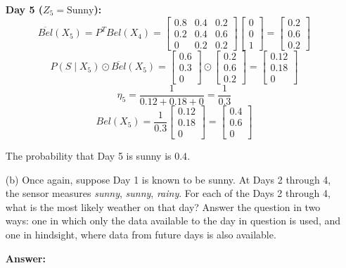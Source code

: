 \documentclass{article}
\begin{document}
\begin{enumerate}
    \textbf{Day 5 ($Z_5 = \text{Sunny}$):}
    $$ \overline{Bel}(X_5) = P^T Bel(X_4) = \begin{bmatrix} 0.8 & 0.4 & 0.2 \\ 0.2 & 0.4 & 0.6 \\ 0 & 0.2 & 0.2 \end{bmatrix} \begin{bmatrix} 0 \\ 0 \\ 1 \end{bmatrix} = \begin{bmatrix} 0.2 \\ 0.6 \\ 0.2 \end{bmatrix} $$
    $$ P(S \mid X_5) \odot \overline{Bel}(X_5) = \begin{bmatrix} 0.6 \\ 0.3 \\ 0 \end{bmatrix} \odot \begin{bmatrix} 0.2 \\ 0.6 \\ 0.2 \end{bmatrix} = \begin{bmatrix} 0.12 \\ 0.18 \\ 0 \end{bmatrix} $$
    $$ \eta_5 = \frac{1}{0.12 + 0.18 + 0} = \frac{1}{0.3} $$
    $$ Bel(X_5) = \frac{1}{0.3} \begin{bmatrix} 0.12 \\ 0.18 \\ 0 \end{bmatrix} = \begin{bmatrix} 0.4 \\ 0.6 \\ 0 \end{bmatrix} $$

    The probability that Day 5 is sunny is $\mathbf{0.4}$.

    \item[(b)] Once again, suppose Day 1 is known to be sunny. At Days 2 through 4, the sensor measures \textit{sunny}, \textit{sunny}, \textit{rainy}. For each of the Days 2 through 4, what is the most likely weather on that day? Answer the question in two ways: one in which only the data available to the day in question is used, and one in hindsight, where data from future days is also available.

    \textbf{Answer:}


\end{enumerate}
\end{document}
